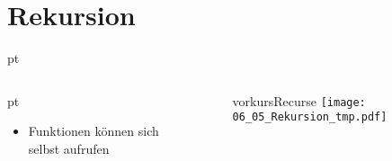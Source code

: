 



\subtitle{Kapitel 6: wie Funktionen funktionieren}
\titlegraphic{
	\begin{columns}
		\begin{column}{4cm}
			\vspace{1.5cm}
			\begin{center}
				{\huge Rekursion}
			\end{center}
		\end{column}
		\begin{column}{4cm}
		\vspace{-5mm}
			\begin{figure}
				\centering
				\includeinvertablegraphics[scale=2.5]{media/tabletop_roleplaying.png}
				\\	\sffamily \tiny Bild: \href{https://xkcd.com/244/}{https://xkcd.com/244/}
			\end{figure}
		\end{column}
	\end{columns}}
\maketitle

\section{Rekursion}
\begin{frame}[t]
	\slidehead

	 pt
	\begin{columns}
		\begin{column}{4.5cm}
			 pt
			\begin{itemize}
				\item Funktionen können sich selbst aufrufen
			\end{itemize}
		\end{column}

		\begin{column}{7cm}
			\begin{figure}
				\ifcsname vorkursRecurse\endcsname
					\texttt{[image: 06\_05\_Rekursion\_tmp.pdf]}
				\fi
			\end{figure}
		\end{column}
	\end{columns}
\end{frame}

